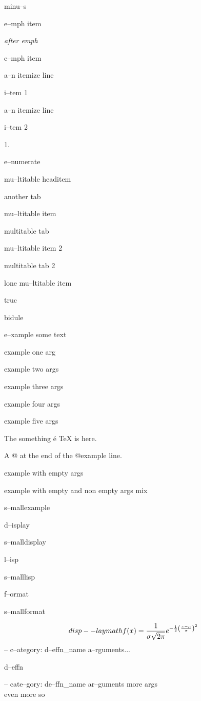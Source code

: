 \documentclass{book}
\begin{document}
minu--s


\emph{} 

e--mph item


\emph{after emph} 

e--mph item


\textbullet{} a--n itemize line 

i--tem 1


\textbullet{} a--n itemize line 

i--tem 2


1. 

e--numerate


mu--ltitable headitem 

another tab


mu--ltitable item 

multitable tab


mu--ltitable item 2 

multitable tab 2


lone mu--ltitable item


truc 

bidule


e--xample  some
   text


example one arg


example two args


example three args


example four args


example five args


The something \'{e} \TeX{} is here.


A @ at the end of the @example line.


example with empty args


example with empty and non empty args mix


s--mallexample


d--isplay


s--malldisplay


l--isp


s--malllisp


f--ormat


s--mallformat


$$
disp--laymath
f(x) = {1 \over \sigma \sqrt{2\pi}}e^{-{1 \over 2}\left({x-\mu \over \sigma}\right)^2}
$$
\hbox{}-- c--ategory: d--effn\_name a--rguments...


d--effn


\hbox{}-- cate--gory: de--ffn\_name ar--guments    more args \leavevmode{}\\ even more so
\end{document}
